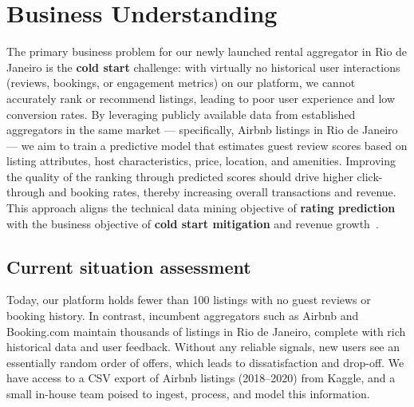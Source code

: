 \section{Business Understanding}\label{chap:businessUnderstanding}

The primary business problem for our newly launched rental aggregator in Rio de Janeiro is the \textbf{cold start} challenge: with virtually no historical user interactions (reviews, bookings, or engagement metrics) on our platform, we cannot accurately rank or recommend listings, leading to poor user experience and low conversion rates. By leveraging publicly available data from established aggregators in the same market --- specifically, Airbnb listings in Rio de Janeiro --- we aim to train a predictive model that estimates guest review scores based on listing attributes, host characteristics, price, location, and amenities. Improving the quality of the ranking through predicted scores should drive higher click-through and booking rates, thereby increasing overall transactions and revenue. This approach aligns the technical data mining objective of \textbf{rating prediction} with the business objective of \textbf{cold start mitigation} and revenue growth~\cite{crispdm2000, airbnb_rio_kaggle}.

\subsection{Current situation assessment}\label{sec:currentSituationAssessment}

Today, our platform holds fewer than 100 listings with no guest reviews or booking history. In contrast, incumbent aggregators such as Airbnb and Booking.com maintain thousands of listings in Rio de Janeiro, complete with rich historical data and user feedback. Without any reliable signals, new users see an essentially random order of offers, which leads to dissatisfaction and drop-off. We have access to a CSV export of Airbnb listings (2018--2020) from Kaggle, and a small in-house team poised to ingest, process, and model this information.

